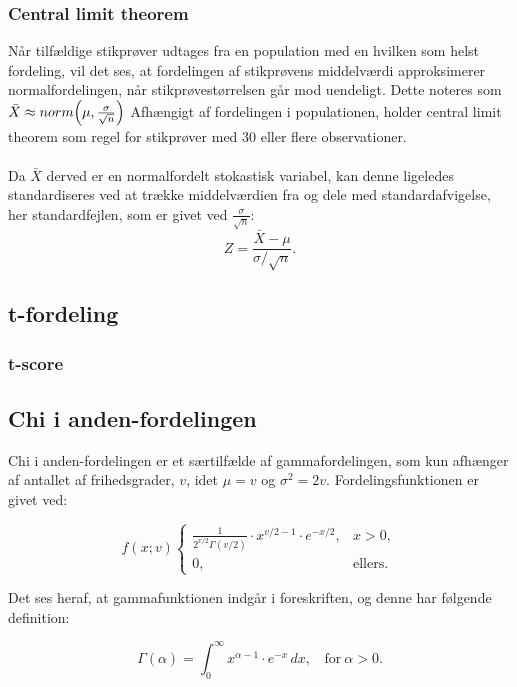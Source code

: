 \subsubsection{Central limit theorem}
Når tilfældige stikprøver udtages fra en population med en hvilken som helst fordeling, vil det ses, at fordelingen af stikprøvens middelværdi approksimerer normalfordelingen, når stikprøvestørrelsen går mod uendeligt.
Dette noteres som $\bar{X} \approx norm\Bigl(\mu,\frac{\sigma}{\sqrt{n}}\Bigr)$ 
Afhængigt af fordelingen i populationen, holder central limit theorem som regel for stikprøver med 30 eller flere observationer. 
\\
\\
\noindent Da $\bar{X}$ derved er en normalfordelt stokastisk variabel, kan denne ligeledes standardiseres ved at trække middelværdien fra og dele med standardafvigelse, her standardfejlen, som er givet ved $\frac{\sigma}{\sqrt{n}}$:
$$Z=\frac{\bar{X}-\mu}{\sigma/\sqrt{n}}.$$


\subsection{t-fordeling}

\subsubsection{t-score}

\subsection{Chi i anden-fordelingen}
Chi i anden-fordelingen er et særtilfælde af gammafordelingen, som kun afhænger af antallet af frihedsgrader, $v$, idet $\mu=v$ og $\sigma^2=2v$.
Fordelingsfunktionen er givet ved:

$$f(x;v)\begin{cases}
    \frac{1}{2^{v/2}\Gamma(v/2)} \cdot x^{v/2-1} \cdot e^{-x/2},  & x > 0, \\
    0, &  \text{ellers.}
  \end{cases}$$

  \noindent Det ses heraf, at gammafunktionen indgår i foreskriften, og denne har følgende definition:

  $$\Gamma(\alpha)=\int_{0}^{\infty}x^{\alpha-1} \cdot e^{-x}\,dx, \ \ \ \  \text{for}\  \alpha > 0.$$
